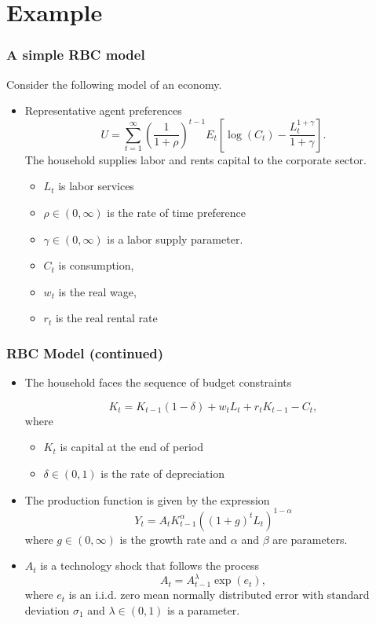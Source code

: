 \documentclass{beamer}
\begin{document}
\section[Example]{Example}
\begin{frame}
  \frametitle{A simple RBC model}
  Consider the following model of an economy.
\begin{itemize}

\item Representative agent preferences
\begin{equation*}
U=\sum_{t=1}^{\infty }\left( \frac{1}{1+\rho }\right) ^{t-1}E_{t}\left[ \log
\left( C_{t}\right) -\frac{L_{t}^{1+\gamma }}{1+\gamma }\right] .
\end{equation*}%
The household supplies labor and rents capital to the corporate sector. 
\begin{itemize}
\item $L_{t}$ is labor services
\item $\rho \in \left( 0,\infty \right) $
is the rate of time preference
\item $\gamma \in \left( 0,\infty \right) $ is a
labor supply parameter. 
\item $C_{t}$ is consumption,
\item $w_{t}$ is the real wage,
\item $r_{t}$ is the real rental rate
\end{itemize}
\end{itemize}
\end{frame}


\begin{frame}
\frametitle{RBC Model (continued)}
\begin{itemize}
\item The household faces the sequence of budget constraints

\begin{equation*}
K_t=K_{t-1}\left( 1-\delta \right) +w_{t}L_{t}+r_{t}K_{t-1}-C_{t},
\end{equation*}%
where 
\begin{itemize}
\item $K_{t}$ is capital at the end of period
\item $\delta \in \left(
0,1\right) $ is the rate of depreciation
\end{itemize}
\item The production function is given by the expression%
\begin{equation*}
Y_{t}=A_{t}K_{t-1}^{\alpha }\left( \left( 1+g\right) ^{t}L_{t}\right) ^{1-\alpha}
\end{equation*}%
where $g\in \left( 0,\infty \right) $ is the growth rate and $\alpha $ and $%
\beta $ are parameters. 
\item $A_{t}$ is a technology shock that follows the
process%
\begin{equation*}
A_{t}=A_{t-1}^{\lambda }\exp \left( e_{t}\right) ,
\end{equation*}%
where $e_{t}$ is an i.i.d. zero mean normally distributed error with
standard deviation $\sigma _{1}$ and $\lambda \in \left( 0,1\right) $ is a
parameter.
\end{itemize}
\end{frame}
\end{document}
